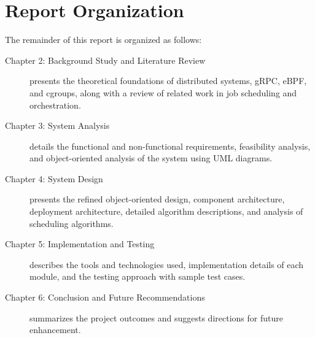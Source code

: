 \section{Report Organization}

The remainder of this report is organized as follows:

\begin{description}
    \item[Chapter 2: Background Study and Literature Review] presents the theoretical foundations of distributed systems, gRPC, eBPF, and cgroups, along with a review of related work in job scheduling and orchestration.
    \item[Chapter 3: System Analysis] details the functional and non-functional requirements, feasibility analysis, and object-oriented analysis of the system using UML diagrams.
    \item[Chapter 4: System Design] presents the refined object-oriented design, component architecture, deployment architecture, detailed algorithm descriptions, and analysis of scheduling algorithms.
    \item[Chapter 5: Implementation and Testing] describes the tools and technologies used, implementation details of each module, and the testing approach with sample test cases.
    \item[Chapter 6: Conclusion and Future Recommendations] summarizes the project outcomes and suggests directions for future enhancement.
\end{description}
